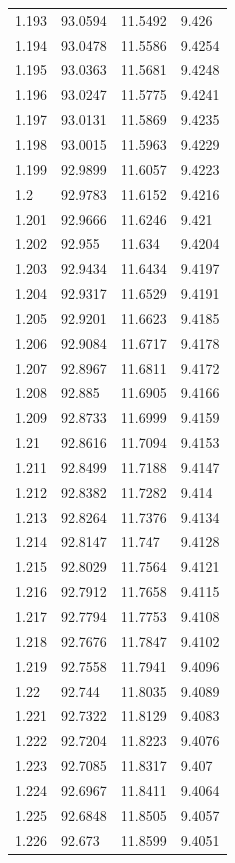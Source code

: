 \begin{tabular}{llll}
1.193 & 93.0594 & 11.5492 & 9.426 \\
1.194 & 93.0478 & 11.5586 & 9.4254 \\
1.195 & 93.0363 & 11.5681 & 9.4248 \\
1.196 & 93.0247 & 11.5775 & 9.4241 \\
1.197 & 93.0131 & 11.5869 & 9.4235 \\
1.198 & 93.0015 & 11.5963 & 9.4229 \\
1.199 & 92.9899 & 11.6057 & 9.4223 \\
1.2 & 92.9783 & 11.6152 & 9.4216 \\
1.201 & 92.9666 & 11.6246 & 9.421 \\
1.202 & 92.955 & 11.634 & 9.4204 \\
1.203 & 92.9434 & 11.6434 & 9.4197 \\
1.204 & 92.9317 & 11.6529 & 9.4191 \\
1.205 & 92.9201 & 11.6623 & 9.4185 \\
1.206 & 92.9084 & 11.6717 & 9.4178 \\
1.207 & 92.8967 & 11.6811 & 9.4172 \\
1.208 & 92.885 & 11.6905 & 9.4166 \\
1.209 & 92.8733 & 11.6999 & 9.4159 \\
1.21 & 92.8616 & 11.7094 & 9.4153 \\
1.211 & 92.8499 & 11.7188 & 9.4147 \\
1.212 & 92.8382 & 11.7282 & 9.414 \\
1.213 & 92.8264 & 11.7376 & 9.4134 \\
1.214 & 92.8147 & 11.747 & 9.4128 \\
1.215 & 92.8029 & 11.7564 & 9.4121 \\
1.216 & 92.7912 & 11.7658 & 9.4115 \\
1.217 & 92.7794 & 11.7753 & 9.4108 \\
1.218 & 92.7676 & 11.7847 & 9.4102 \\
1.219 & 92.7558 & 11.7941 & 9.4096 \\
1.22 & 92.744 & 11.8035 & 9.4089 \\
1.221 & 92.7322 & 11.8129 & 9.4083 \\
1.222 & 92.7204 & 11.8223 & 9.4076 \\
1.223 & 92.7085 & 11.8317 & 9.407 \\
1.224 & 92.6967 & 11.8411 & 9.4064 \\
1.225 & 92.6848 & 11.8505 & 9.4057 \\
1.226 & 92.673 & 11.8599 & 9.4051 \\

\end{tabular}
